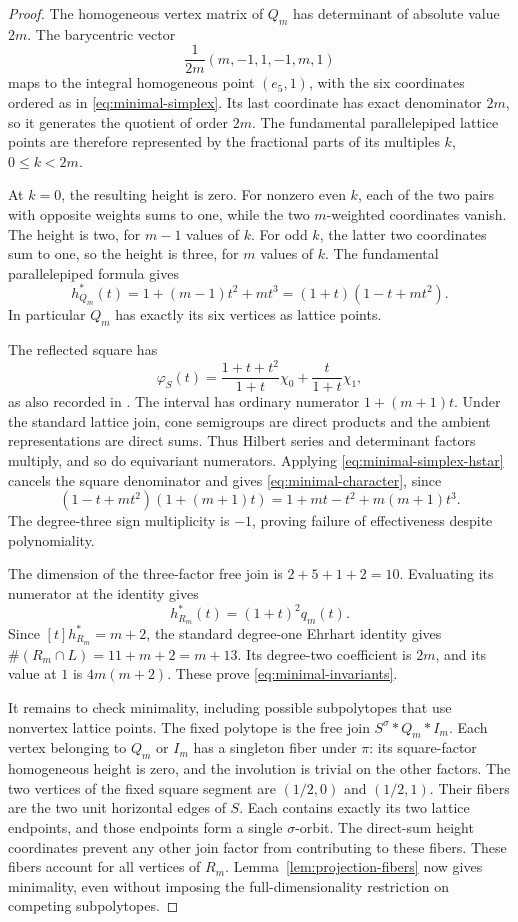 \documentclass[11pt,a4paper]{article}
\theoremstyle{definition}\newtheorem{definition}[lemma]{Definition}
\theoremstyle{remark}\newtheorem{remark}[lemma]{Remark}
\begin{document}
\begin{proof}
The homogeneous vertex matrix of $Q_m$ has determinant of absolute
value $2m$. The barycentric vector
\[
 \frac1{2m}(m,-1,1,-1,m,1)
\]
maps to the integral homogeneous point $(e_5,1)$, with the six
coordinates ordered as in \eqref{eq:minimal-simplex}. Its last coordinate
has exact denominator $2m$, so it generates the quotient of order $2m$.
The fundamental parallelepiped lattice points are therefore represented
by the fractional parts of its multiples $k$, $0\leq k<2m$.

At $k=0$, the resulting height is zero. For nonzero even $k$, each of
the two pairs with opposite weights sums to one, while the two
$m$-weighted coordinates vanish. The height is two, for $m-1$ values of
$k$. For odd $k$, the latter two coordinates sum to one, so the height is
three, for $m$ values of $k$. The fundamental parallelepiped formula gives
\begin{equation}\label{eq:minimal-simplex-hstar}
 h^*_{Q_m}(t)=1+(m-1)t^2+mt^3=(1+t)(1-t+mt^2).
\end{equation}
In particular $Q_m$ has exactly its six vertices as lattice points.

The reflected square has
\[
 \varphi_S(t)=\frac{1+t+t^2}{1+t}\chi_0
                 +\frac{t}{1+t}\chi_1,
\]
as also recorded in \cite[Examples~2.3 and~2.8]{Clarke26}.
The interval has ordinary numerator $1+(m+1)t$. Under the standard
lattice join, cone semigroups are direct products and the ambient
representations are direct sums. Thus Hilbert series and determinant
factors multiply, and so do equivariant numerators. Applying
\eqref{eq:minimal-simplex-hstar} cancels the square denominator and gives
\eqref{eq:minimal-character}, since
\[
 (1-t+mt^2)(1+(m+1)t)=1+mt-t^2+m(m+1)t^3.
\]
The degree-three sign multiplicity is $-1$, proving failure of
effectiveness despite polynomiality.

The dimension of the three-factor free join is
$2+5+1+2=10$. Evaluating its numerator at the identity gives
\[
 h^*_{R_m}(t)=(1+t)^2q_m(t).
\]
Since $[t]h^*_{R_m}=m+2$, the standard degree-one Ehrhart identity gives
$\#(R_m\cap L)=11+m+2=m+13$. Its degree-two coefficient is $2m$, and
its value at $1$ is $4m(m+2)$. These prove
\eqref{eq:minimal-invariants}.

It remains to check minimality, including possible subpolytopes that use
nonvertex lattice points. The fixed polytope is the free join
$S^\sigma*Q_m*I_m$. Each vertex belonging to $Q_m$ or $I_m$ has a
singleton fiber under $\pi$: its square-factor homogeneous height is
zero, and the involution is trivial on the other factors. The two
vertices of the fixed square segment are $(1/2,0)$ and $(1/2,1)$.
Their fibers are the two unit horizontal edges of $S$. Each contains
exactly its two lattice endpoints, and those endpoints form a single
$\sigma$-orbit. The direct-sum height coordinates prevent any other join
factor from contributing to these fibers. These fibers account for all
vertices of $R_m$. Lemma~\ref{lem:projection-fibers} now gives minimality,
even without imposing the full-dimensionality restriction on competing
subpolytopes.
\end{proof}
\end{document}

